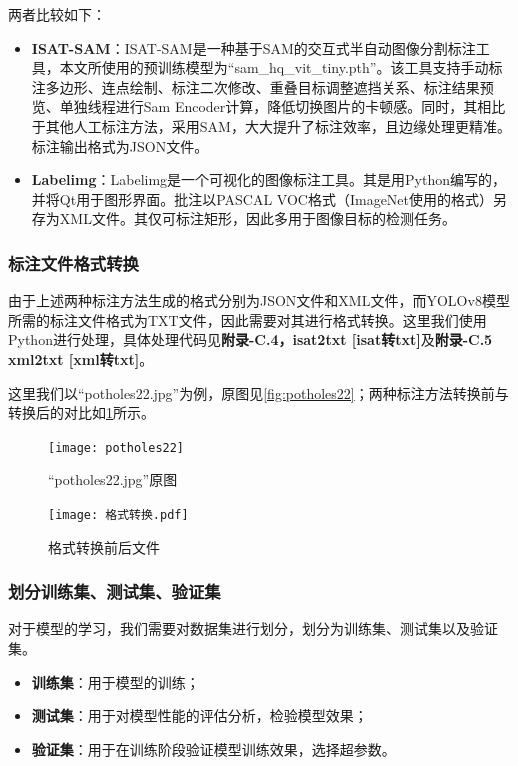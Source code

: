 \documentclass{MathorCupmodeling}
\begin{document}
	两者比较如下：
	\begin{itemize}
		\item \textbf{ISAT-SAM}：ISAT-SAM是一种基于SAM的交互式半自动图像分割标注工具，本文所使用的预训练模型为“sam\_hq\_vit\_tiny.pth”。该工具支持手动标注多边形、连点绘制、标注二次修改、重叠目标调整遮挡关系、标注结果预览、单独线程进行Sam Encoder计算，降低切换图片的卡顿感\textcolor{blue}{\cite{ISAT-SAM}}。同时，其相比于其他人工标注方法，采用SAM，大大提升了标注效率，且边缘处理更精准。标注输出格式为JSON文件。
		\item \textbf{Labelimg}：Labelimg是一个可视化的图像标注工具。其是用Python编写的，并将Qt用于图形界面。批注以PASCAL VOC格式（ImageNet使用的格式）另存为XML文件\textcolor{blue}{\cite{Labelimg}}。其仅可标注矩形，因此多用于图像目标的检测任务。
	\end{itemize}
	\subsubsection{标注文件格式转换}
	由于上述两种标注方法生成的格式分别为JSON文件和XML文件，而YOLOv8模型所需的标注文件格式为TXT文件，因此需要对其进行格式转换。这里我们使用Python进行处理，具体处理代码见\textbf{附录-C.4，isat2txt [isat转txt]}及\textbf{附录-C.5 xml2txt [xml转txt]}。

	这里我们以“potholes22.jpg”为例，原图见\textcolor{blue}{\cref{fig:potholes22}}；两种标注方法转换前与转换后的对比如\textcolor{blue}{\cref{fig:格式转换}}所示。
	\begin{figure}[H]
		\centering
		\begin{minipage}{0.45\linewidth}
		  \centering
		  \texttt{[image: potholes22]}
		  \caption{“potholes22.jpg”原图}
		  \label{fig:potholes22}
		\end{minipage}
		\begin{minipage}{0.45\linewidth}
		  \centering
		  \texttt{[image: 格式转换.pdf]}
		  \caption{格式转换前后文件}
		  \label{fig:格式转换}
		\end{minipage}
	\end{figure}

	\subsubsection{划分训练集、测试集、验证集}
	对于模型的学习，我们需要对数据集进行划分，划分为训练集、测试集以及验证集。
	\begin{itemize}
		\item \textbf{训练集}：用于模型的训练；
		\item \textbf{测试集}：用于对模型性能的评估分析，检验模型效果；
		\item \textbf{验证集}：用于在训练阶段验证模型训练效果，选择超参数。
	\end{itemize}
	
\end{document}
